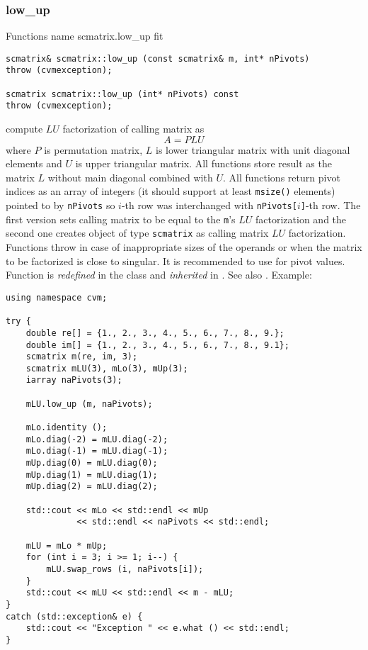 \subsubsection{low\_up}
Functions%
\pdfdest name {scmatrix.low_up} fit
\begin{verbatim}
scmatrix& scmatrix::low_up (const scmatrix& m, int* nPivots)
throw (cvmexception);

scmatrix scmatrix::low_up (int* nPivots) const
throw (cvmexception);
\end{verbatim}
compute $LU$ factorization of  calling matrix as
\begin{equation*}
A=PLU
\end{equation*}
where $P$ is  permutation matrix, $L$ is  lower
triangular matrix with unit diagonal
elements and $U$ is  upper triangular matrix.
All functions store result as the matrix $L$ without
main diagonal combined with $U$. All functions
return pivot indices as an array of integers
(it should support at least \verb"msize()" elements)
pointed to by \verb"nPivots" so \hbox{$i$-th} row
was interchanged with \hbox{\verb"nPivots["$i$\verb"]"-th} row.
The first version sets  calling matrix to be equal to the
\verb"m"'s $LU$ factorization and the second one
creates  object of type \verb"scmatrix" as  calling matrix
$LU$ factorization.
Functions throw 
in case of inappropriate
sizes of the operands or when the matrix to be factorized is close to
singular. It is recommended to use 
for pivot values.
Function is \emph{redefined} in the class
and \emph{inherited} in .
See also
.
Example:
\begin{Verbatim}
using namespace cvm;

try {
    double re[] = {1., 2., 3., 4., 5., 6., 7., 8., 9.};
    double im[] = {1., 2., 3., 4., 5., 6., 7., 8., 9.1};
    scmatrix m(re, im, 3);
    scmatrix mLU(3), mLo(3), mUp(3);
    iarray naPivots(3);

    mLU.low_up (m, naPivots);

    mLo.identity ();
    mLo.diag(-2) = mLU.diag(-2);
    mLo.diag(-1) = mLU.diag(-1);
    mUp.diag(0) = mLU.diag(0);
    mUp.diag(1) = mLU.diag(1);
    mUp.diag(2) = mLU.diag(2);

    std::cout << mLo << std::endl << mUp 
              << std::endl << naPivots << std::endl;

    mLU = mLo * mUp;
    for (int i = 3; i >= 1; i--) {
        mLU.swap_rows (i, naPivots[i]);
    }
    std::cout << mLU << std::endl << m - mLU;
}
catch (std::exception& e) {
    std::cout << "Exception " << e.what () << std::endl;
}
\end{Verbatim}
